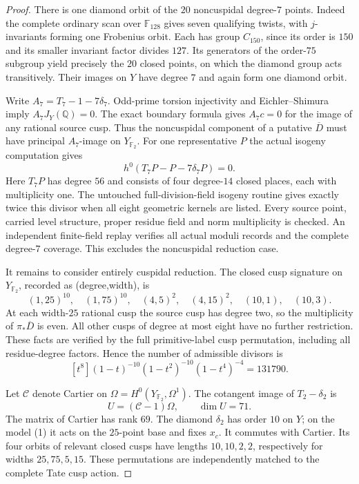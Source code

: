 \begin{proof}
There is one diamond orbit of the $20$ noncuspidal degree-$7$ points.
Indeed the complete ordinary scan over $\mathbb F_{128}$ gives seven
qualifying twists, with $j$-invariants forming one Frobenius orbit.
Each has group $C_{150}$, since its order is $150$ and its smaller
invariant factor divides $127$. Its generators of the order-$75$
subgroup yield precisely the $20$ closed points, on which the diamond
group acts transitively. Their images on $Y$ have degree $7$ and
again form one diamond orbit.

Write $A_7=T_7-1-7\delta_7$. Odd-prime torsion injectivity and
Eichler--Shimura imply $A_7J_Y(\mathbb Q)=0$. The exact boundary
formula gives $A_7c=0$ for the image of any rational source cusp.
Thus the noncuspidal component of a putative $\overline D$ must have
principal $A_7$-image on $Y_{\mathbb F_2}$. For one representative
$P$ the actual isogeny computation gives
\[
 h^0(T_7P-P-7\delta_7P)=0.
\]
Here $T_7P$ has degree $56$ and consists of four degree-$14$ closed
places, each with multiplicity one. The untouched full-division-field
isogeny routine gives exactly twice this divisor when all eight
geometric kernels are listed. Every source point, carried level
structure, proper residue field and norm multiplicity is checked.
An independent finite-field replay verifies all actual moduli records
and the complete degree-$7$ coverage. This excludes the noncuspidal
reduction case.

It remains to consider entirely cuspidal reduction. The closed cusp
signature on $Y_{\mathbb F_2}$, recorded as (degree,width), is
\[
 (1,25)^{10},\quad(1,75)^{10},\quad
 (4,5)^2,\quad(4,15)^2,\quad(10,1),\quad(10,3).
\]
At each width-$25$ rational cusp the source cusp has degree two,
so the multiplicity of $\pi_*\overline D$ is even. All other cusps
of degree at most eight have no further restriction. These facts
are verified by the full primitive-label cusp permutation, including
all residue-degree factors. Hence the number of admissible divisors is
\[
 [t^8](1-t)^{-10}(1-t^2)^{-10}(1-t^4)^{-4}=131790.
\]

Let $\mathcal C$ denote Cartier on
$\Omega=H^0(Y_{\mathbb F_2},\Omega^1)$. The cotangent image of
$T_2-\delta_2$ is
\[
 U=(\mathcal C-1)\Omega,\qquad \dim U=71.
\]
The matrix of Cartier has rank $69$. The diamond $\delta_2$ has order
$10$ on $Y$; on the model (1) it acts on the $25$-point base and fixes
$x_c$. It commutes with Cartier. Its four orbits of relevant closed
cusps have lengths $10,10,2,2$, respectively for widths $25,75,5,15$.
These permutations are independently matched to the complete Tate
cusp action.


\end{proof}
